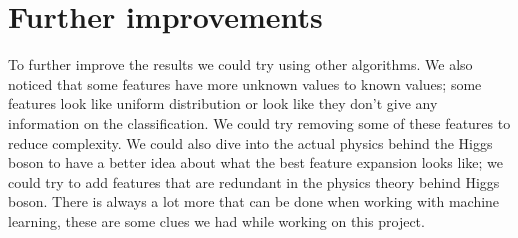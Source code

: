 \documentclass[10pt,conference,compsocconf]{IEEEtran}
\begin{document}
\section{Further improvements}
To further improve the results we could try using other algorithms. We also noticed that some features have more unknown values to known values; some features look like uniform distribution or look like they don't give any information on the classification. We could try removing some of these features to reduce complexity. We could also dive into the actual physics behind the Higgs boson to have a better idea about what the best feature expansion looks like; we could try to add features that are redundant in the physics theory behind Higgs boson. There is always a lot more that can be done when working with machine learning, these are some clues we had while working on this project.
\end{document}
